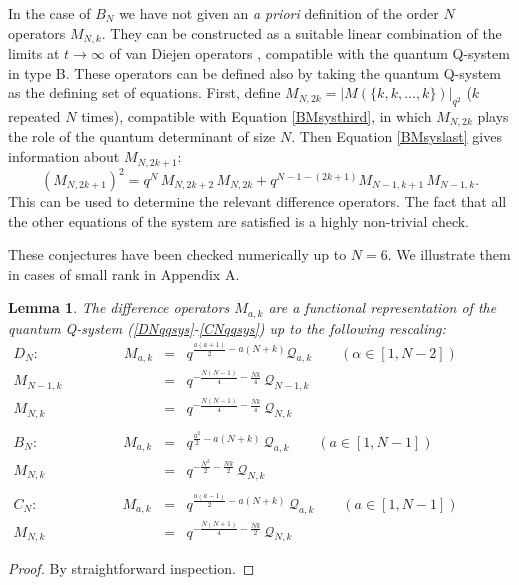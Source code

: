 \documentclass[12pt]{amsart}
\newtheorem{lemma}[thm]{Lemma}
\newcommand{\Q}{{\mathcal Q}}
\newcommand{\al}{{\alpha}}
\numberwithin{equation}{section}
\numberwithin{table}{section}
\begin{document}
In the case of $B_N$ we have not given an {\it a priori} definition of the order $N$ operators $M_{N,k}$.
They can be constructed as a suitable linear combination
of the limits at $t\to\infty$ of van Diejen operators \cite{vandiej,vandiejtwo}, compatible with the quantum Q-system in type B. 
These operators can be defined also by taking the quantum Q-system as the defining set of equations. First, define
$M_{N,2k}=\vert M(\{k,k,...,k\})\vert_{q^2}$ ($k$ repeated $N$ times), compatible with  Equation \eqref{BMsysthird},
in which $M_{N,2k}$ plays the role of the  quantum determinant of size $N$. Then Equation \eqref{BMsyslast}
gives information about $M_{N,2k+1}$:
$$(M_{N,2k+1})^2=q^N\, M_{N,2k+2}\,M_{N,2k}+q^{N-1-(2k+1)} M_{N-1,k+1}\,M_{N-1,k}.$$
This can be used to determine the relevant difference operators.
The fact that all the other equations of the system are satisfied is a highly non-trivial check.

These conjectures have been checked numerically up to $N=6$. We illustrate them in cases of small rank in Appendix A.


\begin{lemma}
The difference operators $M_{a,k}$ are a functional representation of the quantum Q-system  (\ref{DNqqsys}-\ref{CNqqsys}) up to the following rescaling:
\begin{eqnarray}D_N:\qquad\qquad\qquad
M_{a,k}&=& q^{\frac{a(a+1)}{2} -a(N+k)} \Q_{a,k}\qquad (\al\in[1,N-2])\nonumber\\
M_{N-1,k}&=& q^{-\frac{N(N-1)}{4}-\frac{Nk}{4}}\, \Q_{N-1,k}\nonumber\\
M_{N,k}&=& q^{-\frac{N(N-1)}{4}-\frac{Nk}{4}}\, \Q_{N,k}\qquad \qquad\qquad\qquad \qquad\qquad\qquad \qquad\qquad\label{Dch}\\
\nonumber\\
B_N:\qquad\qquad \qquad M_{a,k}&=& q^{\frac{a^2}{2}-a (N+k)} \,\Q_{a,k}\qquad (a\in[1,N-1])
\nonumber\\
M_{N,k}&=& q^{-\frac{N^2}{2}-\frac{Nk}{2}} \,\Q_{N,k}\label{Bch}\\
\nonumber\\
C_N:\qquad\qquad \qquad M_{a,k}&=&q^{\frac{a(a-1)}{2}-a(N+k)} \,\Q_{a,k}\qquad (a\in[1,N-1])
\nonumber\\
M_{N,k}&=&q^{-\frac{N(N+1)}{4}-\frac{Nk}{2}}\, \Q_{N,k}\label{Cch}
\end{eqnarray}
\end{lemma}
\begin{proof} By straightforward inspection.\end{proof}
\end{document}
